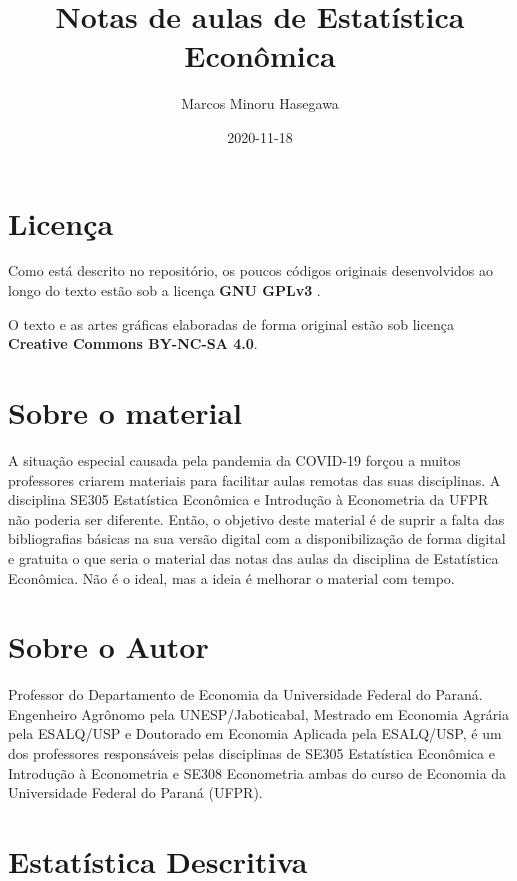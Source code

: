\documentclass[
]{book}
\title{Notas de aulas de Estatística Econômica}
\author{Marcos Minoru Hasegawa}
\date{2020-11-18}
\begin{document}
\maketitle

{
\setcounter{tocdepth}{1}
\tableofcontents
}
\hypertarget{licenuxe7a}{%
\chapter*{Licença}\label{licenuxe7a}}

Como está descrito no repositório, os poucos códigos originais desenvolvidos ao longo do texto estão sob a licença \textbf{GNU GPLv3} .

O texto e as artes gráficas elaboradas de forma original estão sob licença \textbf{Creative Commons BY-NC-SA 4.0}.

\hypertarget{sobre-o-material}{%
\chapter*{Sobre o material}\label{sobre-o-material}}

A situação especial causada pela pandemia da COVID-19 forçou a muitos professores criarem materiais para facilitar aulas remotas das suas disciplinas. A disciplina SE305 Estatística Econômica e Introdução à Econometria da UFPR não poderia ser diferente. Então, o objetivo deste material é de suprir a falta das bibliografias básicas na sua versão digital com a disponibilização de forma digital e gratuita o que seria o material das notas das aulas da disciplina de Estatística Econômica. Não é o ideal, mas a ideia é melhorar o material com tempo.

\hypertarget{sobre-o-autor}{%
\chapter*{Sobre o Autor}\label{sobre-o-autor}}

Professor do Departamento de Economia da Universidade Federal do Paraná. Engenheiro Agrônomo pela UNESP/Jaboticabal, Mestrado em Economia Agrária pela ESALQ/USP e Doutorado em Economia Aplicada pela ESALQ/USP, é um dos professores responsáveis pelas disciplinas de SE305 Estatística Econômica e Introdução à Econometria e SE308 Econometria ambas do curso de Economia da Universidade Federal do Paraná (UFPR).

\hypertarget{estatuxedstica-descritiva}{%
\chapter{Estatística Descritiva}\label{estatuxedstica-descritiva}}
\end{document}
